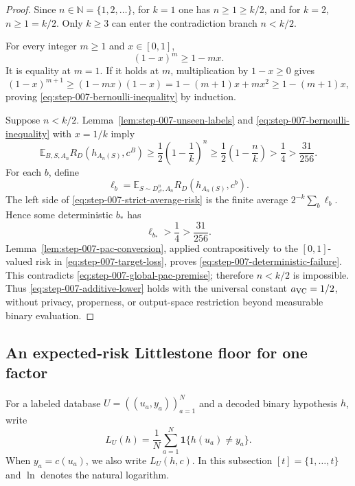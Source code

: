 \begin{proof}
Since \(n\in\mathbb N=\{1,2,\ldots\}\), for \(k=1\) one has
\(n\ge1\ge k/2\), and for \(k=2\), \(n\ge1=k/2\).  Only \(k\ge3\)
can enter the contradiction branch \(n<k/2\).

For every integer \(m\ge1\) and \(x\in[0,1]\),
\begin{equation}\label{eq:step-007-bernoulli-inequality}
(1-x)^m\ge1-mx.
\end{equation}
It is equality at \(m=1\).  If it holds at \(m\), multiplication by
\(1-x\ge0\) gives
\[
(1-x)^{m+1}
\ge(1-mx)(1-x)
=1-(m+1)x+mx^2
\ge1-(m+1)x,
\]
proving \eqref{eq:step-007-bernoulli-inequality} by induction.

Suppose \(n<k/2\).  Lemma~\ref{lem:step-007-unseen-labels} and
\eqref{eq:step-007-bernoulli-inequality} with \(x=1/k\) imply
\begin{equation}\label{eq:step-007-strict-average-risk}
\mathbb E_{B,S,A_n}R_D(h_{A_n(S)},c^B)
\ge\frac12\left(1-\frac1k\right)^n
\ge\frac12\left(1-\frac nk\right)
>\frac14>\frac{31}{256}.
\end{equation}
For each \(b\), define
\begin{equation}\label{eq:step-007-target-loss}
\ell_b=\mathbb E_{S\sim D_{c^b}^n,A_n}
R_D(h_{A_n(S)},c^b).
\end{equation}
The left side of \eqref{eq:step-007-strict-average-risk} is the finite
average \(2^{-k}\sum_b\ell_b\).  Hence some deterministic \(b_*\) has
\begin{equation}\label{eq:step-007-target-extraction}
\ell_{b_*}>\frac14>\frac{31}{256}.
\end{equation}
Lemma~\ref{lem:step-007-pac-conversion}, applied contrapositively to the
\([0,1]\)-valued risk in \eqref{eq:step-007-target-loss}, proves
\eqref{eq:step-007-deterministic-failure}.  This contradicts
\eqref{eq:step-007-global-pac-premise}; therefore \(n<k/2\) is impossible.
Thus \eqref{eq:step-007-additive-lower} holds with the universal constant
\(a_{\rm VC}=1/2\), without privacy, properness, or output-space
restriction beyond measurable binary evaluation.
\end{proof}

\subsection{An expected-risk Littlestone floor for one factor}
\label{app:step-008}

For a labeled database \(U=((u_a,y_a))_{a=1}^N\) and a decoded binary
hypothesis \(h\), write
\[
L_U(h)=\frac1N\sum_{a=1}^N\mathbf1\{h(u_a)\ne y_a\}.
\]
When \(y_a=c(u_a)\), we also write \(L_U(h,c)\).  In this subsection
\([t]=\{1,\ldots,t\}\) and \(\ln\) denotes the natural logarithm.

